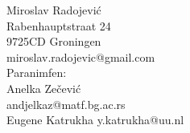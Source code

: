 \documentclass[10pt]{report}
\begin{document}
\begin{center}
	\bigskip

  	{\Large Miroslav Radojevi\'{c}}\\[0.5em]
  	Rabenhauptstraat 24\\
  	9725CD Groningen\\
  	miroslav.radojevic@gmail.com\\[1em]
  	{\normalsize Paranimfen:}\\[0.5em]
  	An\dj elka Ze\v{c}evi\'{c}\\
  	andjelkaz@matf.bg.ac.rs\\[0.5em]
  	Eugene Katrukha
  	y.katrukha@uu.nl
  
\end{center}

\end{document}
